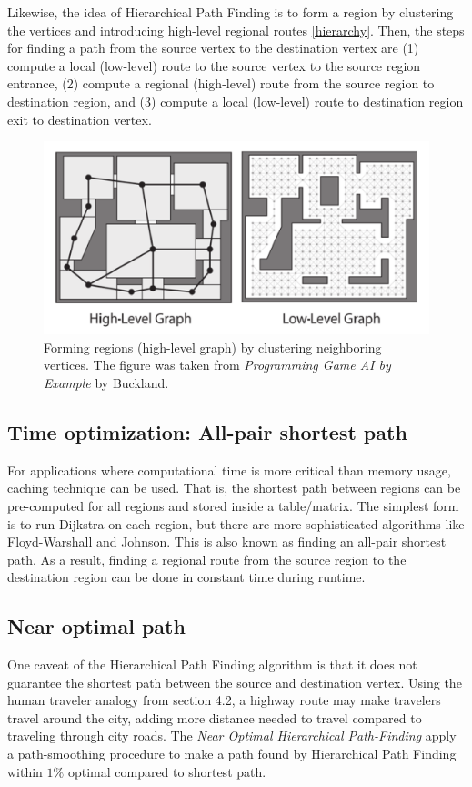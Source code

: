 \documentclass{article}
\begin{document}
Likewise, the idea of Hierarchical Path Finding is to form a region by clustering the vertices and introducing high-level regional routes \autoref{hierarchy}. Then, the steps for finding a path from the source vertex to the destination vertex are (1) compute a local (low-level) route to the source vertex to the source region entrance, (2) compute a regional (high-level) route from the source region to destination region, and (3) compute a local (low-level) route to destination region exit to destination vertex.

\begin{figure} 
\centering
\includegraphics[scale=0.4]{hierarchy.png}
\caption{Forming regions (high-level graph) by clustering neighboring vertices. The figure was taken from \textit{Programming Game AI by Example} by Buckland\cite{Buckland}.} 
\label{hierarchy}
\end{figure}


\subsection{Time optimization: All-pair shortest path}
For applications where computational time is more critical than memory usage, caching technique can be used\cite{Buckland}. That is, the shortest path between regions can be pre-computed for all regions and stored inside a table/matrix. The simplest form is to run Dijkstra on each region, but there are more sophisticated algorithms like Floyd-Warshall and Johnson. This is also known as finding an all-pair shortest path. As a result, finding a regional route from the source region to the destination region can be done in constant time during runtime. 

\subsection{Near optimal path}
One caveat of the Hierarchical Path Finding algorithm is that it does not guarantee the shortest path between the source and destination vertex. Using the human traveler analogy from section 4.2, a highway route may make travelers travel around the city, adding more distance needed to travel compared to traveling through city roads\cite{Botea2004NearOH}. The \textit{Near Optimal Hierarchical Path-Finding} apply a path-smoothing procedure to make a path found by Hierarchical Path Finding within $1\%$ optimal compared to shortest path\cite{Botea2004NearOH}.
\end{document}
